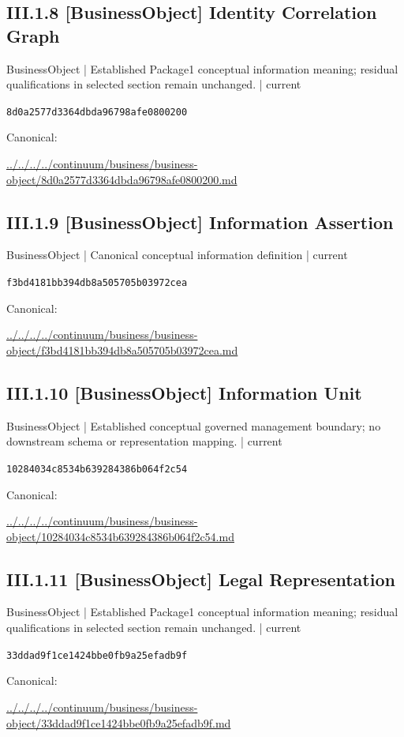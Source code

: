 \documentclass[10pt,a4paper]{article}
\begin{document}
\subsection*{III.1.8 [BusinessObject] Identity Correlation Graph}
{\small BusinessObject | Established Package1 conceptual information meaning; residual qualifications in selected section remain unchanged. | current}\par
\texttt{8d0a2577d3364dbda96798afe0800200}\par
Canonical: \par
{\footnotesize\url{../../../../continuum/business/business-object/8d0a2577d3364dbda96798afe0800200.md}}\par
\subsection*{III.1.9 [BusinessObject] Information Assertion}
{\small BusinessObject | Canonical conceptual information definition | current}\par
\texttt{f3bd4181bb394db8a505705b03972cea}\par
Canonical: \par
{\footnotesize\url{../../../../continuum/business/business-object/f3bd4181bb394db8a505705b03972cea.md}}\par
\subsection*{III.1.10 [BusinessObject] Information Unit}
{\small BusinessObject | Established conceptual governed management boundary; no downstream schema or representation mapping. | current}\par
\texttt{10284034c8534b639284386b064f2c54}\par
Canonical: \par
{\footnotesize\url{../../../../continuum/business/business-object/10284034c8534b639284386b064f2c54.md}}\par
\subsection*{III.1.11 [BusinessObject] Legal Representation}
{\small BusinessObject | Established Package1 conceptual information meaning; residual qualifications in selected section remain unchanged. | current}\par
\texttt{33ddad9f1ce1424bbe0fb9a25efadb9f}\par
Canonical: \par
{\footnotesize\url{../../../../continuum/business/business-object/33ddad9f1ce1424bbe0fb9a25efadb9f.md}}\par
\end{document}
